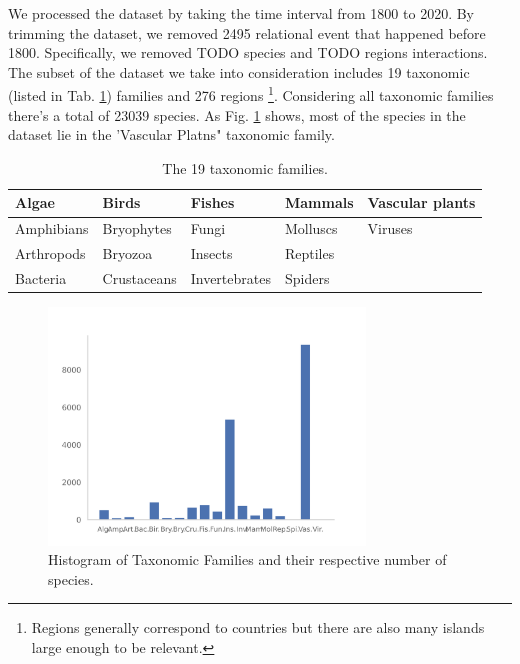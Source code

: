 \documentclass[mscthesis]{usiinfthesis}
\begin{document}
We processed the dataset by taking the time interval from 1800 to 2020. By trimming the dataset, we removed 2495 relational event that happened before 1800. Specifically, we removed TODO species and TODO regions interactions. The subset of the dataset we take into consideration includes 19 taxonomic (listed in Tab. \ref{table:families}) families and 276 regions \footnote{Regions generally correspond to countries but there are also many islands large enough to be relevant.}. Considering all taxonomic families there's a total of 23039 species. As Fig. \ref{fig:hist_tax_fam} shows, most of the species in the dataset lie in the 'Vascular Platns" taxonomic family.

\begin{table}[H]
\centering
\begin{tabular}{|l|l|l|l|l|}
\hline
Algae      & Birds       & Fishes        & Mammals  & Vascular plants \\ \hline
Amphibians & Bryophytes  & Fungi         & Molluscs & Viruses         \\ \hline
Arthropods & Bryozoa     & Insects       & Reptiles &                 \\ \hline
Bacteria   & Crustaceans & Invertebrates & Spiders  &                 \\ \hline             
\end{tabular}
\caption{The 19 taxonomic families.}
\label{table:families}
\end{table}

\begin{figure}[H]
    \centering
    \includegraphics[width=0.75\textwidth]{histogram_taxfam}
    \caption{Histogram of Taxonomic Families and their respective number of species.}
    \label{fig:hist_tax_fam}
\end{figure}
\end{document}
